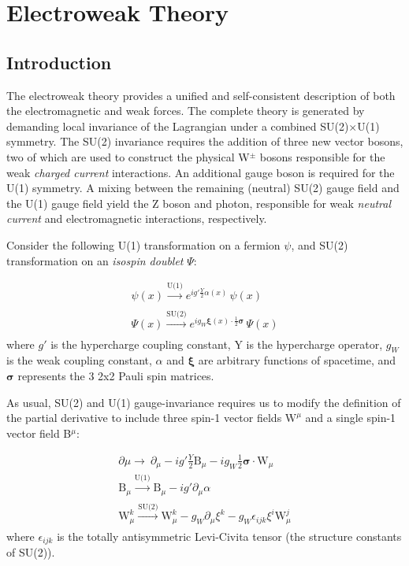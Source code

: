 \section{Electroweak Theory} 

\subsection{Introduction}

The electroweak theory provides a unified and self-consistent description of both the electromagnetic and weak forces. The complete theory is generated by demanding local invariance of the Lagrangian under a combined SU(2)$\times$U(1) symmetry. The SU(2) invariance requires the addition of three new vector bosons, two of which are used to construct the physical W$^{\pm}$ bosons responsible for the weak \textit{charged current} interactions. An additional gauge boson is required for the U(1) symmetry. A mixing between the remaining (neutral) SU(2) gauge field and the U(1) gauge field yield the Z boson and photon, responsible for weak \textit{neutral current} and electromagnetic interactions, respectively. 

Consider the following U(1) transformation on a fermion $\psi$, and SU(2) transformation on an \textit{isospin doublet} $\Psi$:

\begin{equation}
\begin{array}{l}
\psi(x) \xrightarrow[]{\text{U(1)}} e^{i g' \frac{Y}{2} \alpha(x)} \, \psi(x) \\
\Psi(x) \xrightarrow[]{\text{SU(2)}} e^{i g_{W} \bm{\xi}(x) \cdot \frac{1}{2} \bm{\sigma} } \, \Psi(x) 
\end{array}
\end{equation}
where $g'$ is the hypercharge coupling constant, Y is the hypercharge operator, $g_{W}$ is the weak coupling constant, $\alpha$ and $\bm{\xi}$ are arbitrary functions of spacetime, and $\bm{\sigma}$ represents the 3 2x2 Pauli spin matrices.

As usual, SU(2) and U(1) gauge-invariance requires us to modify the definition of the partial derivative to include three spin-1 vector fields $\bm{\mathrm{W}}^{\mu}$ and a single spin-1 vector field B$^{\mu}$:

\begin{equation}
\begin{array}{l}
\partial{\mu} \rightarrow\ \partial_{\mu} - i g' \frac{Y}{2}\mathrm{B}_{\mu} -  i g_{W} \frac{1}{2}\bm{\sigma} \cdot \bm{\mathrm{W}}_{\mu}\\
\mathrm{B}_{\mu} \xrightarrow[]{\text{U(1)}} \mathrm{B}_{\mu} - i g' \partial_{\mu} \alpha \\
\mathrm{W}^{k}_{\mu} \xrightarrow[]{\text{SU(2)}} \mathrm{W}^{k}_{\mu} - g_{W} \partial_{\mu} \xi^{k} -  g_{W} \epsilon_{ijk} \xi^{i} \mathrm{W}^{j}_{\mu}
 \end{array}
\end{equation}
where $\epsilon_{ijk}$ is the totally antisymmetric Levi-Civita tensor (the structure constants of SU(2)).

